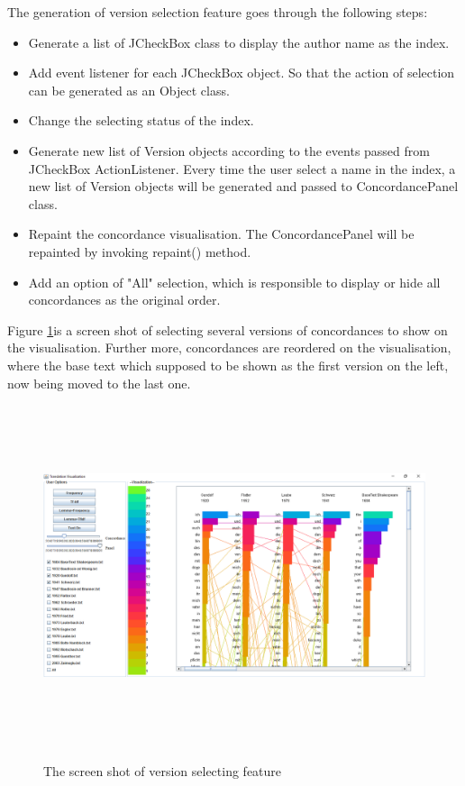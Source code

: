 The generation of version selection feature goes through the following steps:
\begin{itemize}
	\item \textbf{} Generate a list of JCheckBox class to display the author name as the index. 
	\item \textbf{} Add event listener for each JCheckBox object. So that the action of selection can be generated as an Object class.
	\item \textbf{} Change the selecting status of the index. 
	\item \textbf{} Generate new list of Version objects according to the events passed from JCheckBox ActionListener. Every time the user select a name in the index, a new list of Version objects will be generated and passed to ConcordancePanel class. 
	\item \textbf{} Repaint the concordance visualisation. The ConcordancePanel will be repainted by invoking repaint() method.
	\item \textbf{} Add an option of "All" selection, which is responsible to display or hide all concordances as the original order.
\end{itemize}

Figure \ref{fig:versionChoosDemo}is a screen shot of selecting several versions of concordances to show on the visualisation. Further more, concordances are reordered on the visualisation, where the base text which supposed to be shown as the first version on the left, now being moved to the last one.

\begin{figure}[h]
	\centering	
	\includegraphics[width=18cm, height=10cm]{Figs/Version-Selecting-Demo}\\[1ex]
	\caption{The screen shot of version selecting feature}
	\label{fig:versionChoosDemo}
\end{figure} 

